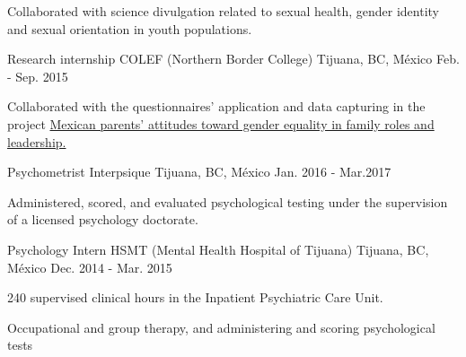 \begin{cventries}
{\begin{cvitems}
            \item {Collaborated with science divulgation related to sexual health, gender identity and sexual orientation in youth populations.}
            \end{cvitems}
        }
     \cventry
        {Research internship}
        {COLEF (Northern Border College)}
        {Tijuana, BC, México}
        {Feb. - Sep. 2015}
        {
            \begin{cvitems}
            \item {Collaborated with the questionnaires' application and data capturing in the project \href{https://estudiosdemograficosyurbanos.colmex.mx/index.php/edu/article/view/1791/pdf}{Mexican parents’ attitudes toward gender equality in family roles and leadership.}
            }
            \end{cvitems}
        }
\end{cventries}
\vspace{-3.2mm}
\begin{cventries}
    \cventry
        {Psychometrist}
        {Interpsique}
        {Tijuana, BC, México}
        {Jan. 2016 - Mar.2017}
        {
            \begin{cvitems}
                \item {Administered, scored, and evaluated psychological testing under the supervision of a licensed psychology doctorate.}
            \end{cvitems}
        }
    \cventry
        {Psychology Intern}
        {HSMT (Mental Health Hospital of Tijuana)}
        {Tijuana, BC, México}
        {Dec. 2014 - Mar. 2015}
        {
            \begin{cvitems}
                \item {240 supervised clinical hours in the Inpatient Psychiatric Care Unit.}
                \item {Occupational and group therapy, and administering and scoring psychological tests}
            \end{cvitems}
        }
\end{cventries}
\vspace{-3.2mm}

